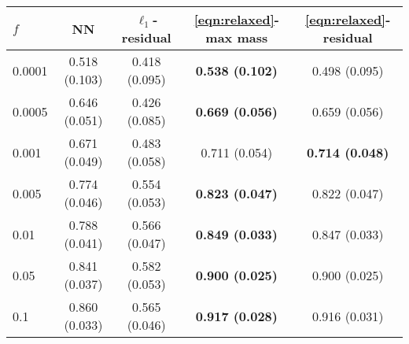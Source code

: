 \begin{tabular}{|l||c|c|c|c|}
\hline
$f$ & NN & $\ell_1$-residual & \eqref{eqn:relaxed}-max mass & \eqref{eqn:relaxed}-residual \\
\hline\hline
0.0001 & 0.518 (0.103) & 0.418 (0.095) & \textbf{0.538 (0.102)} & 0.498 (0.095) \\
\hline
0.0005 & 0.646 (0.051) & 0.426 (0.085) & \textbf{0.669 (0.056)} & 0.659 (0.056) \\
\hline
0.001 & 0.671 (0.049) & 0.483 (0.058) & 0.711 (0.054) & \textbf{0.714 (0.048)} \\
\hline
0.005 & 0.774 (0.046) & 0.554 (0.053) & \textbf{0.823 (0.047)} & 0.822 (0.047) \\
\hline
0.01 & 0.788 (0.041) & 0.566 (0.047) & \textbf{0.849 (0.033)} & 0.847 (0.033) \\
\hline
0.05 & 0.841 (0.037) & 0.582 (0.053) & \textbf{0.900 (0.025)} & 0.900 (0.025) \\
\hline
0.1 & 0.860 (0.033) & 0.565 (0.046) & \textbf{0.917 (0.028)} & 0.916 (0.031) \\
\hline
\end{tabular}
